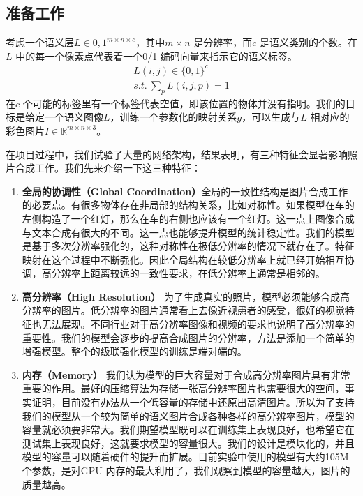 \documentclass{ctexart}
\begin{document}
        \subsection{准备工作}
            考虑一个语义层$L \in {0,1}^{m\times n \times c}$，其中$m\times n$ 是分辨率，而$c$ 是语义类别的个数。在$L$ 中的每一个像素点代表着一个0/1 编码向量来指示它的语义标签。
            \begin{equation}
                \begin{split}
                    L(i,j) \in \{0,1\}^c \\
                    s.t.\ \sum_pL(i,j,p) = 1
                \end{split}
            \end{equation}
            在$c$ 个可能的标签里有一个标签代表空值，即该位置的物体并没有指明。我们的目标是给定一个语义图像$L$，训练一个参数化的映射关系$g$，可以生成与$L$ 相对应的彩色图片$I\in \mathbb{R}^{m\times n \times 3}$。

            在项目过程中，我们试验了大量的网络架构，结果表明，有三种特征会显著影响照片合成工作。我们先来介绍一下这三种特征：
            \begin{enumerate}
                \item \textbf{全局的协调性（Global Coordination）}全局的一致性结构是图片合成工作的必要点。有很多物体存在非局部的结构关系，比如对称性。如果模型在车的左侧构造了一个红灯，那么在车的右侧也应该有一个红灯。这一点上图像合成与文本合成有很大的不同。这一点也能够提升模型的统计稳定性。我们的模型是基于多次分辨率强化的，这种对称性在极低分辨率的情况下就存在了。特征映射在这个过程中不断强化。因此全局结构在较低分辨率上就已经开始相互协调，高分辨率上距离较远的一致性要求，在低分辨率上通常是相邻的。

                \item \textbf{高分辨率（High Resolution）} 为了生成真实的照片，模型必须能够合成高分辨率的图片。低分辨率的图片通常看上去像近视患者的感受，很好的视觉特征也无法展现。不同行业对于高分辨率图像和视频的要求也说明了高分辨率的重要性。我们的模型会逐步的提高合成图片的分辨率，方法是添加一个简单的增强模型。整个的级联强化模型的训练是端对端的。

                \item \textbf{内存（Memory）} 我们认为模型的巨大容量对于合成高分辨率图片具有非常重要的作用。最好的压缩算法为存储一张高分辨率图片也需要很大的空间，事实证明，目前没有办法从一个低容量的存储中还原出高清图片。所以为了支持我们的模型从一个较为简单的语义图片合成各种各样的高分辨率图片，模型的容量就必须要非常大。我们期望模型既可以在训练集上表现良好，也希望它在测试集上表现良好，这就要求模型的容量很大。我们的设计是模块化的，并且模型的容量可以随着硬件的提升而扩展。目前实验中使用的模型有大约105M 个参数，是对GPU 内存的最大利用了，我们观察到模型的容量越大，图片的质量越高。

            \end{enumerate}
\end{document}
